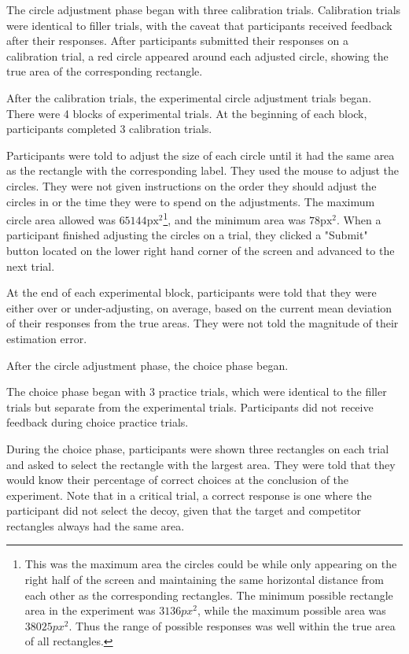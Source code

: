 The circle adjustment phase began with three calibration trials. Calibration trials were identical to filler trials, with the caveat that participants received feedback after their responses. After participants submitted their responses on a calibration trial, a red circle appeared around each adjusted circle, showing the true area of the corresponding rectangle.  

After the calibration trials, the experimental circle adjustment trials began. There were 4 blocks of experimental trials. At the beginning of each block, participants completed $3$ calibration trials. 

Participants were told to adjust the size of each circle until it had the same area as the rectangle with the corresponding label. They used the mouse to adjust the circles. They were not given instructions on the order they should adjust the circles in or the time they were to spend on the adjustments. The maximum circle area allowed was $65144 \text{px}^2$\footnote{This was the maximum area the circles could be while only appearing on the right half of the screen and maintaining the same horizontal distance from each other as the corresponding rectangles. The minimum possible rectangle area in the experiment was $3136px^2$, while the maximum possible area was $38025px^2$. Thus the range of possible responses was well within the true area of all rectangles.}, and the minimum area was $78 \text{px}^2$. When a participant finished adjusting the circles on a trial, they clicked a "Submit" button located on the lower right hand corner of the screen and advanced to the next trial. 

At the end of each experimental block, participants were told that they were either over or under-adjusting, on average, based on the current mean deviation of their responses from the true areas. They were not told the magnitude of their estimation error.

After the circle adjustment phase, the choice phase began. 

The choice phase began with $3$ practice trials, which were identical to the filler trials but separate from the experimental trials. Participants did not receive feedback during choice practice trials. 

During the choice phase, participants were shown three rectangles on each trial and asked to select the rectangle with the largest area. They were told that they would know their percentage of correct choices at the conclusion of the experiment. Note that in a critical trial, a correct response is one where the participant did not select the decoy, given that the target and competitor rectangles always had the same area.


